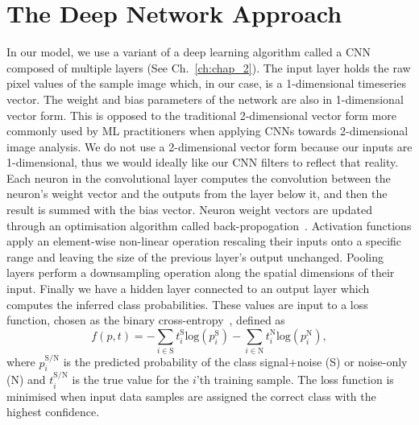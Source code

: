 %
% 
\section{The Deep Network Approach}
%
%
In our model, we use a variant of a deep learning algorithm called a 
\ac{CNN}~\cite{726791} composed of multiple layers (See Ch.~\ref{ch:chap_2}). 
The input layer holds the raw pixel values of the sample image which, in our 
case, is a 1-dimensional timeseries vector. The weight and bias 
parameters of the network are also in 1-dimensional vector 
form. This is opposed to the traditional 2-dimensional vector form more 
commonly used by \ac{ML} practitioners when applying \ac{CNN}s towards 
2-dimensional image analysis. We do not use a 2-dimensional 
vector form because our inputs are 1-dimensional, thus we would ideally 
like our \ac{CNN} filters to reflect that reality. Each neuron in 
the convolutional layer computes the convolution between the neuron's 
weight vector and the outputs from the layer below it, and then the 
result is summed with the bias vector. Neuron weight vectors are 
updated through an optimisation algorithm 
called back-propogation~\cite{LeCun1998}. Activation 
functions apply an element-wise non-linear operation 
rescaling their inputs onto a specific range and leaving the 
size of the previous layer's output unchanged. Pooling layers 
perform a downsampling operation along the spatial dimensions 
of their input. Finally we have a hidden layer connected to an output layer which
computes the inferred class probabilities. These values are 
input to a loss function, chosen as the 
binary cross-entropy~\cite{tensorflow2015-whitepaper}, defined as
%
%
\begin{equation} \label{eq:loss} 
f(p,t) =
-\sum_{i\in\text{S}}t_{i}^{\mathrm{S}}\mathrm{log}(p^{\text{S}}_{i})-\sum_{i\in\text{N}}t_{i}^{\mathrm{N}}\mathrm{log}(p^{\text{N}}_{i}), 
\end{equation}
%
where $p^{\text{S/N}}_{i}$ is the predicted probability of the class signal+noise (S) or noise-only (N) and $t^{\text{S/N}}_{i}$ is the true value 
for the $i$'th training sample. The loss function is minimised when input data samples are assigned the correct class with the highest confidence. 

